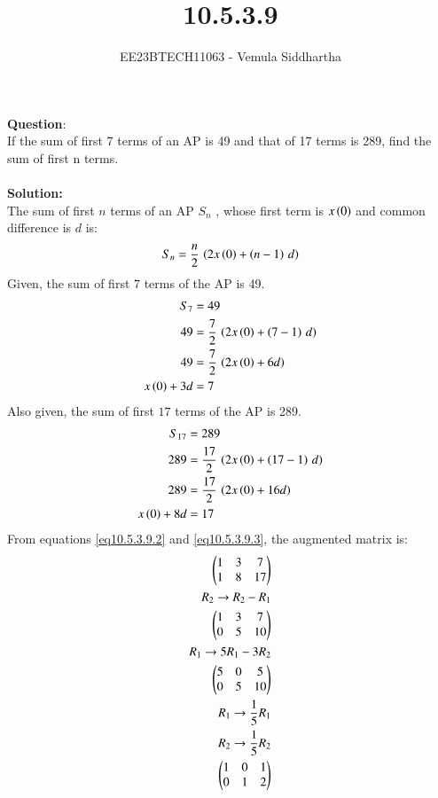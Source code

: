 \documentclass[journal,12pt,twocolumn]{IEEEtran}
\theoremstyle{remark}
\begin{document}

\vspace{3cm}

\title{10.5.3.9}
\author{EE23BTECH11063 - Vemula Siddhartha
}
\maketitle
\newpage
\bigskip

\renewcommand{\thefigure}{\theenumi}
\renewcommand{\thetable}{\theenumi}
\textbf{Question}:\\
If the sum of first 7 terms of an AP is 49 and that of 17 terms is 289, find the sum of
first n terms.
\\\\
\textbf{Solution: }\\
The sum of first $n$ terms of an AP $S_n$ , whose first term is $x\left(0\right)$ and common difference is $d$ is:
\begin{align}
S_n=\frac{n}{2}\,\left(2x\left(0\right)+\left(n-1\right)\,d\right)\label{eq10.5.3.9.1}
\end{align}
Given, the sum of first $7$ terms of the AP is 49.
\begin{align}
S_7&=49 \\
49&=\frac{7}{2}\,\left(2x\left(0\right)+\left(7-1\right)\,d\right)  \\
49&=\frac{7}{2}\,\left(2x\left(0\right)+6d\right)  \\
x\left(0\right)+3d&=7\label{eq10.5.3.9.2}
\end{align}
Also given, the sum of first $17$ terms of the AP is 289.
\begin{align}
S_{17}&=289  \\
289&=\frac{17}{2}\,\left(2x\left(0\right)+\left(17-1\right)\,d\right)  \\
289&=\frac{17}{2}\,\left(2x\left(0\right)+16d\right)  \\
x\left(0\right)+8d&=17 \label{eq10.5.3.9.3}
\end{align}
From  equations \ref{eq10.5.3.9.2} and \ref{eq10.5.3.9.3}, the augmented matrix is:
\begin{align}\vspace{3cm}
 \begin{pmatrix}
1&3&7\\
1&8&17
 \end{pmatrix}
 \\
 R_2\rightarrow R_2-R_1\notag\\
 \begin{pmatrix}
    1&3&7\\
    0&5&10
 \end{pmatrix}
 \\
 R_1\rightarrow 5R_1-3R_2\notag\\
 \begin{pmatrix}
    5&0&5\\
    0&5&10
 \end{pmatrix}
 \\
 R_1\rightarrow\frac{1}{5}R_1\notag\\ R_2\rightarrow\frac{1}{5}R_2\notag\\
 \begin{pmatrix}
    1&0&1\\
    0&1&2
 \end{pmatrix}
\end{align}
\end{document}
